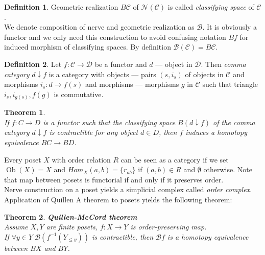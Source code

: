 \documentclass[a4paper, 12pt]{article}
\newtheorem{theorem}{Theorem}
\theoremstyle{definition}
\newtheorem{definition}{Definition}
\theoremstyle{remark}
\newcommand{\define}[1]{{\textit{#1}}}
\begin{document}
\begin{definition}
  Geometric realization $B\mathcal{C}$ of $\mathcal{N}(\mathcal{C})$ is called \define{classifying space} of $\mathcal{C}$.\\

  We denote composition of nerve and geometric realization as $\mathcal{B}$. It is obviously a functor and we only need this construction to avoid confusing notation $Bf$ for induced morphism of classifying spaces. By definition $\mathcal{B}(\mathcal{C}) = B\mathcal{C}$.
\end{definition}

\begin{definition}
  Let $f: \mathcal{C} \to \mathcal{D}$ be a functor and $d$ --- object in $\mathcal{D}$. Then \define{comma category} $d \downarrow f$ is a category with objects --- pairs $(s,i_s)$ of objects in $\mathcal{C}$ and morphisms $i_s : d \to f(s)$ and morphisms --- morphisms $g$ in $\mathcal{C}$ such that triangle $i_s, i_{g(s)}, f(g)$ is commutative.
\end{definition}

\begin{theorem} {\cite[Theorem A]{Quillen72}}\\
  If $f: C \to D$ is a functor such that the classifying space $B(d \downarrow f)$ of the comma category $d \downarrow f$ is contractible for any object $d \in D$, then $f$ induces a homotopy equivalence $BC \to BD$.
\end{theorem}

Every poset $X$ with order relation $R$ can be seen as a category if we set $\operatorname{Ob}(X) = X$ and $Hom_X(a,b) = \{r_{ab}\}$ if $(a,b) \in R$ and $\emptyset$ otherwise. Note that map between posets is functorial if and only if it preserves order.\\
Nerve construction on a poset yields a simplicial complex called \define{order complex}. Application of Quillen A theorem to posets yields the following theorem:

\begin{theorem} \textbf{Quillen-McCord theorem}\\
  Assume $X, Y$ are finite posets, $f : X \to Y$ is order-preserving map.\\
  If $\forall y \in Y\;\mathcal{B}(f^{-1}(Y_{\leqslant y}))$ is contractible, then $\mathcal{B}f$ is a homotopy equivalence between $BX$ and $BY$.\\
\end{theorem}
\end{document}
